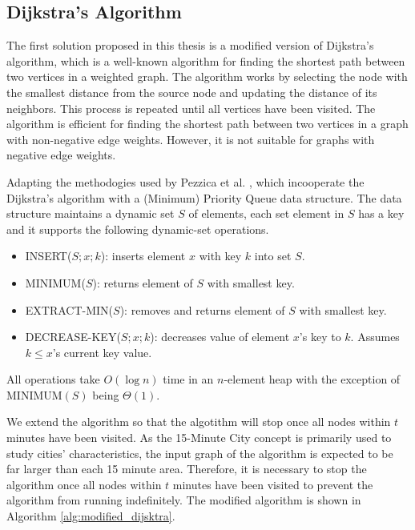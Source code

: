 \subsection{Dijkstra's Algorithm}

The first solution proposed in this thesis is a modified version of Dijkstra's algorithm, which is a well-known algorithm for finding the shortest path between two vertices in a weighted graph. The algorithm works by selecting the node with the smallest distance from the source node and updating the distance of its neighbors. This process is repeated until all vertices have been visited. The algorithm is efficient for finding the shortest path between two vertices in a graph with non-negative edge weights. However, it is not suitable for graphs with negative edge weights.

Adapting the methodogies used by Pezzica et al. \cite{cormen2022introduction}, which incooperate the Dijkstra's algorithm with a (Minimum) Priority Queue data structure. The data structure maintains a dynamic set $S$ of elements, each set element in $S$ has a key and it supports the following dynamic-set operations.

\begin{itemize}
    \item INSERT($S; x; k$): inserts element $x$ with key $k$ into set $S$.
    \item MINIMUM($S$): returns element of $S$ with smallest key.
    \item EXTRACT-MIN($S$): removes and returns element of $S$ with smallest key.
    \item DECREASE-KEY($S;x;k$): decreases value of element $x$’s key to $k$. Assumes $k\leq x$’s current key value.
\end{itemize}

All operations take $O(\log n)$ time in an $n$-element heap with the exception of $\text{MINIMUM}(S)$ being $\Theta(1)$.

We extend the algorithm so that the algotithm will stop once all nodes within $t$ minutes have been visited. As the 15-Minute City concept is primarily used to study cities' characteristics, the input graph of the algorithm is expected to be far larger than each 15 minute area. Therefore, it is necessary to stop the algorithm once all nodes within $t$ minutes have been visited to prevent the algorithm from running indefinitely. The modified algorithm is shown in Algorithm \ref{alg:modified_dijsktra}.

